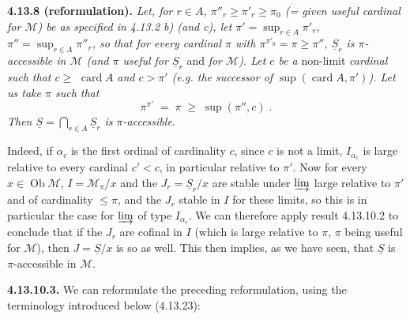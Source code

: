 \documentclass[11pt]{article}
\newcommand{\msp}[1]{\marginpar{\footnotesize [#1]}}
\newcommand{\card}{\operatorname{card}}
\newcommand{\Ob}{\operatorname{Ob}}
\begin{document}
\textbf{4.13.8 (reformulation).} \textit{Let, for $r\in A$, $\pi''_r\geqslant\pi'_r\geqslant\pi_0$ (= given useful cardinal for $\mathcal{M}$) be as specified in 4.13.2 b) (and c), let $\pi'=\sup_{r\in A}\pi'_r$, $\pi''=\sup_{r\in A}\pi''_r$, so that for every cardinal $\pi$ with $\pi^{\pi'_0}=\pi\geqslant\pi''$, $\underline{S}_r$ is $\pi$-accessible in $\mathcal{M}$ (and $\pi$ useful for $\underline{S}_r$} and \textit{for $\mathcal{M}$). Let $c$ be a} non-limit \textit{cardinal such that $c\geqslant$} $\card A$ \textit{and $c>\pi'$ (e.g. the successor of} $\sup(\card A,\pi')$\textit{). Let us take $\pi$ such that}
\[ \pi^{\pi'} \; = \; \pi \; \geqslant \; \sup(\pi'',c) \; . \]
\textit{Then $\underline{S}=\bigcap_{r\in A}\underline{S}_r$ is $\pi$-accessible.}

Indeed, if $\alpha_c$ is the first ordinal of cardinality $c$, since $c$ is not a limit, $I_{\alpha_c}$ is large relative to every cardinal $c'<c$, in particular relative to $\pi'$. Now for every $x\in\Ob\mathcal{M}$, $I=\mathcal{M}_\pi/x$ and the $J_r=\underline{S}_r/x$ are stable under $\varinjlim$ large relative to $\pi'$ and of cardinality $\leqslant\pi$,
\msp{page 302 bis}
and the $J_r$ stable in $I$ for these limits, so this is in particular the case for $\varinjlim$ of type $I_{\alpha_c}$. We can therefore apply result 4.13.10.2 to conclude that if the $J_r$ are cofinal in $I$ (which is large relative to $\pi$, $\pi$ being useful for $\mathcal{M}$), then $J=\underline{S}/x$ is so as well. This then implies, as we have seen, that $\underline{S}$ is $\pi$-accessible in $\mathcal{M}$.

\textbf{4.13.10.3.} We can reformulate the preceding reformulation, using the terminology introduced below (4.13.23):
\end{document}
